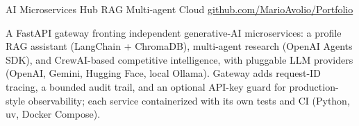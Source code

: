 
\begin{cventries}

  \cventry
    {AI Microservices Hub} %
    {RAG {\enskip\cdotp\enskip} Multi-agent {\enskip\cdotp\enskip} Cloud} %
    {} %
    {\href{https://github.com/MarioAvolio/Portfolio}{github.com/MarioAvolio/Portfolio}} %
    {
      \begin{cvitems}
        \item {A FastAPI gateway fronting independent generative-AI microservices: a profile RAG assistant (LangChain + ChromaDB), multi-agent research (OpenAI Agents SDK), and CrewAI-based competitive intelligence, with pluggable LLM providers (OpenAI, Gemini, Hugging Face, local Ollama). Gateway adds request-ID tracing, a bounded audit trail, and an optional API-key guard for production-style observability; each service containerized with its own tests and CI (Python, uv, Docker Compose).}
      \end{cvitems}
    }

\end{cventries}
